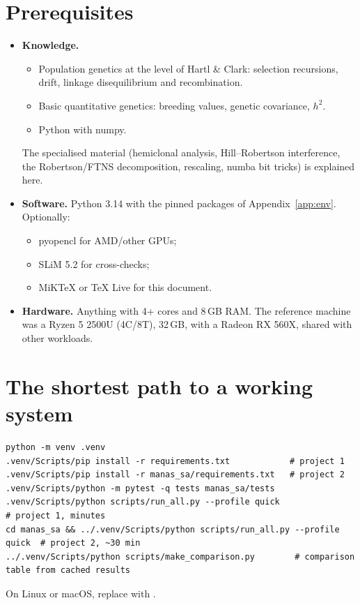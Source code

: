 \section{Prerequisites}
\begin{itemize}
\item \textbf{Knowledge.}
  \begin{itemize}
  \item Population genetics at the level of Hartl \& Clark: selection recursions, drift, linkage disequilibrium and recombination.
  \item Basic quantitative genetics: breeding values, genetic covariance, $h^2$.
  \item Python with numpy.
  \end{itemize}
  The specialised material (hemiclonal analysis, Hill--Robertson interference, the Robertson/FTNS decomposition, rescaling, numba bit tricks) is explained here.
\item \textbf{Software.} Python 3.14 with the pinned packages of Appendix~\ref{app:env}. Optionally:
  \begin{itemize}
  \item pyopencl for AMD/other GPUs;
  \item SLiM 5.2 for cross-checks;
  \item MiKTeX or TeX Live for this document.
  \end{itemize}
\item \textbf{Hardware.} Anything with 4+ cores and 8\,GB RAM. The reference machine was a Ryzen 5 2500U (4C/8T), 32\,GB, with a Radeon RX 560X, shared with other workloads.
\end{itemize}

\section{The shortest path to a working system}
\begin{lstlisting}[style=sh]
python -m venv .venv
.venv/Scripts/pip install -r requirements.txt            # project 1
.venv/Scripts/pip install -r manas_sa/requirements.txt   # project 2
.venv/Scripts/python -m pytest -q tests manas_sa/tests
.venv/Scripts/python scripts/run_all.py --profile quick               # project 1, minutes
cd manas_sa && ../.venv/Scripts/python scripts/run_all.py --profile quick  # project 2, ~30 min
../.venv/Scripts/python scripts/make_comparison.py        # comparison table from cached results
\end{lstlisting}
On Linux or macOS, replace  with .
